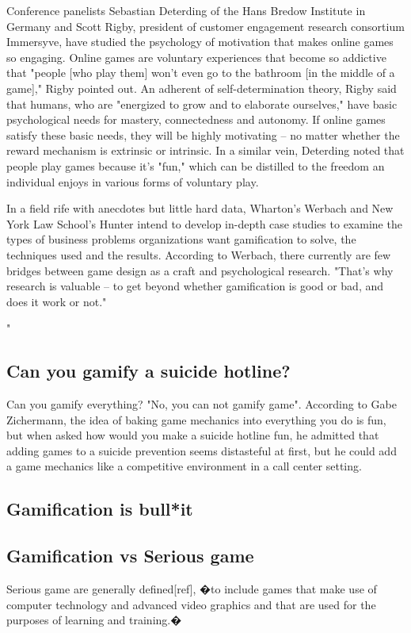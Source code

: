 Conference panelists Sebastian Deterding of the Hans Bredow Institute in Germany and Scott Rigby, president of customer engagement research consortium Immersyve, have studied the psychology of motivation that makes online games so engaging. Online games are voluntary experiences that become so addictive that "people [who play them] won't even go to the bathroom [in the middle of a game]," Rigby pointed out. An adherent of self-determination theory, Rigby said that humans, who are "energized to grow and to elaborate ourselves," have basic psychological needs for mastery, connectedness and autonomy. If online games satisfy these basic needs, they will be highly motivating -- no matter whether the reward mechanism is extrinsic or intrinsic. In a similar vein, Deterding noted that people play games because it's "fun," which can be distilled to the freedom an individual enjoys in various forms of voluntary play.

In a field rife with anecdotes but little hard data, Wharton's Werbach and New York Law School's Hunter intend to develop in-depth case studies to examine the types of business problems organizations want gamification to solve, the techniques used and the results. According to Werbach, there currently are few bridges between game design as a craft and psychological research. "That's why research is valuable -- to get beyond whether gamification is good or bad, and does it work or not."

"

\subsection{Can you gamify a suicide hotline?}
Can you gamify everything? "No, you can not gamify game". According to Gabe Zichermann, the idea of baking game mechanics into everything you do is fun, but when asked how would you make a suicide hotline fun, he admitted that adding games to a suicide prevention seems distasteful at first, but he could add a game mechanics like a competitive environment in a call center setting.

\subsection{Gamification is bull*it}

\subsection{Gamification vs Serious game}
Serious game are generally defined[ref], �to include games that make use of computer technology and advanced video graphics and that are used for the purposes of learning and training.�

